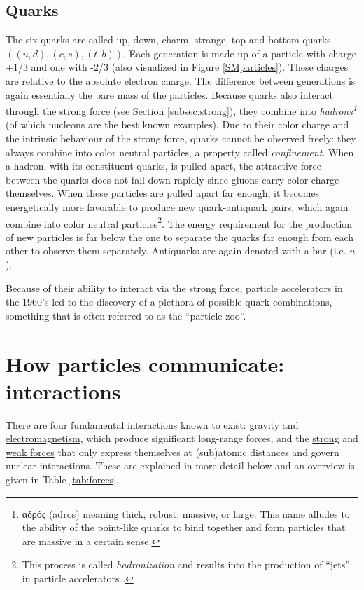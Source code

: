\subsection{Quarks}
\label{sub:quarks}
The six quarks are called up, down, charm, strange, top and bottom quarks $((u,d),(c,s),(t,b))$.
Each generation is made up of a particle with charge +1/3 and one with -2/3 (also visualized in Figure \ref{SMparticles}). These charges are relative to the absolute electron charge.
The difference between generations is again essentially the bare mass of the particles. Because quarks also interact through the strong force (see Section \ref{subsec:strong}), they combine into 
\textit{hadrons\footnote{\gr αδρός \en (adros) meaning thick, robust, massive, or large. This name alludes to the ability of the point-like quarks to bind together and form particles that are massive in a certain sense.}} (of which nucleons are the best known examples). Due to their color charge and the intrinsic behaviour of the strong force, quarks cannot be observed freely: they always combine into color neutral particles, a property called \textit{confinement}. When a hadron, with its constituent quarks, is pulled apart, the attractive force between the quarks does not fall down rapidly since gluons carry color charge themselves. When these particles are pulled apart far enough, it becomes energetically more favorable to produce new quark-antiquark pairs, which again combine into color neutral particles\footnote{This process is called \textit{hadronization} and results into the production of ``jets'' in particle accelerators \cite{cmsjetsurl}.}. The energy requirement for the production of new particles is far below the one to separate the quarks far enough from each other to observe them separately. Antiquarks are again denoted with a bar (i.e. $\bar{u}$).

Because of their ability to interact via the strong force, particle accelerators in the 1960's led to the discovery of a plethora of possible quark combinations, something that is often referred to as the ``particle zoo''.



\section{How particles communicate: interactions}

There are four fundamental interactions known to exist: \underline{gravity} and \underline{electromagnetism}, which produce significant long-range forces, and the \underline{strong} and \underline{weak forces} that only express themselves at (sub)atomic distances and govern nuclear interactions. These are explained in more detail below and an overview is given in Table \ref{tab:forces}.


